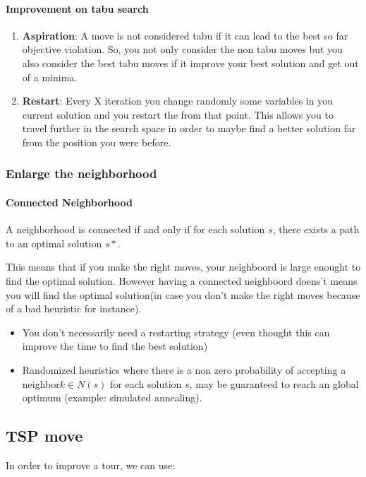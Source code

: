 \paragraph{Improvement on tabu search}
\begin{enumerate}
    \item \textbf{Aspiration}: A move is not considered tabu if it can lead to
        the best so far objective violation.
        So, you not only consider the non tabu moves but you also consider the best
        tabu moves if it improve your best solution and get out of a
        minima.
        
    \item \textbf{Restart}:
        Every X iteration you change randomly some variables in you current
        solution and you restart the from that point. This allows you to travel
        further in the search space in order to maybe find a better solution far
        from the position you were before.
\end{enumerate}


\subsubsection{Enlarge the neighborhood}

\paragraph{Connected Neighborhood}
A neighborhood is connected if and only if for each
solution $s$, there exists a path to an optimal solution $s*$.


This means that if you make the right moves, your neighboord is large
enought to find the optimal solution. However having a connected
neighboord doens't means you will find the optimal solution(in case you
don't make the right moves because of a bad heuristic for
instance).

\begin{itemize}
    \item You don’t necessarily need a restarting strategy (even thought
        this can improve the time to find the best solution)
    \item Randomized heuristics where there is a non zero
        probability of accepting a neighbor$ k \in N(s)$ for each
        solution $s$, may be guaranteed to reach an global
        optimum (example: simulated annealing).
\end{itemize}

\subsection{TSP move}
In order to improve a tour, we can use:

